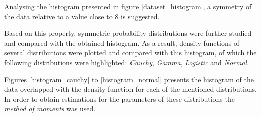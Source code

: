 \documentclass[12pt]{article}
\begin{document}
Analysing the histogram presented in figure \ref{dataset_histogram}, a symmetry of the data relative to a value close to 8 is suggested.

Based on this property, symmetric probability distributions were further studied and compared with the obtained histogram. As a result, density functions of several distributions were plotted and compared with this histogram, of which the following distributions were highlighted: \emph{Cauchy}, \emph{Gamma}, \emph{Logistic} and \emph{Normal}.

Figures \ref{histogram_cauchy} to \ref{histogram_normal} presents the histogram of the data overlapped with the density function for each of the mentioned distributions. In order to obtain estimations for the parameters of these distributions the \emph{method of moments} was used.
\end{document}

